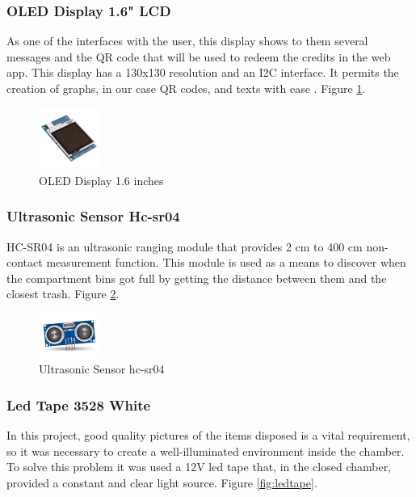 \documentclass[a4paper,11pt]{article}
\begin{document}
\subsubsection{OLED Display 1.6" \space LCD}
\label{subsubsec:oleddisplay}
As one of the interfaces with the user, this display shows to them several messages and the QR code that will be used to redeem the credits in the web app. This display has a 130x130 resolution and an I2C interface. It permits the creation of graphs, in our case QR codes, and texts with ease \cite{oleddisplay}. Figure \ref{fig:display}.

\begin{figure}[H]
  \centering
  \includegraphics[width=2cm]{Figures/Display-LCD-TFT-1.6-130x130-Transflectivo-6-600x600.jpg}
  \caption{\small{OLED Display 1.6 inches}}
  \label{fig:display}
\end{figure}

\subsubsection{Ultrasonic Sensor Hc-sr04}
\label{subsubsec:ultrasonic}
HC-SR04 is an ultrasonic ranging module that provides 2 cm to 400 cm non-contact measurement function\cite{ultrasonic}. This module is used as a means to discover when the compartment bins got full by getting the distance between them and the closest trash. Figure \ref{fig:ultrasonic}.

\begin{figure}[H]
  \centering
  \includegraphics[width=2cm]{Figures/ultrasonico_hc.jpg}
  \caption{\small{Ultrasonic Sensor hc-sr04}}
  \label{fig:ultrasonic}
\end{figure}

\subsubsection{Led Tape 3528 White}
\label{subsubsec:ledtape}
In this project, good quality pictures of the items disposed is a vital requirement, so it was necessary to create a well-illuminated environment inside the chamber. To solve this problem it was used a 12V led tape that, in the closed chamber, provided a constant and clear light source. Figure \ref{fig:ledtape}.
\end{document}
